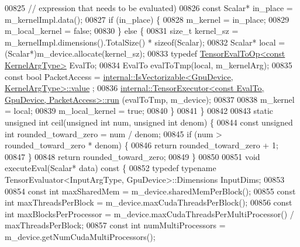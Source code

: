 \begin{DoxyCode}
00825     \textcolor{comment}{// expression that needs to be evaluated)}
00826     \textcolor{keyword}{const} Scalar* in\_place = m\_kernelImpl.data();
00827     \textcolor{keywordflow}{if} (in\_place) \{
00828       m\_kernel = in\_place;
00829       m\_local\_kernel = \textcolor{keyword}{false};
00830     \} \textcolor{keywordflow}{else} \{
00831       \textcolor{keywordtype}{size\_t} kernel\_sz = m\_kernelImpl.dimensions().TotalSize() * \textcolor{keyword}{sizeof}(Scalar);
00832       Scalar* local = (Scalar*)m\_device.allocate(kernel\_sz);
00833       \textcolor{keyword}{typedef} \hyperlink{class_eigen_1_1_tensor_eval_to_op}{TensorEvalToOp<const KernelArgType>} EvalTo;
00834       EvalTo evalToTmp(local, m\_kernelArg);
00835       \textcolor{keyword}{const} \textcolor{keywordtype}{bool} PacketAccess = 
      \hyperlink{struct_eigen_1_1internal_1_1_is_vectorizable}{internal::IsVectorizable<GpuDevice, KernelArgType>::value}
      ;
00836       \hyperlink{class_eigen_1_1internal_1_1_tensor_executor}{internal::TensorExecutor<const EvalTo, GpuDevice, PacketAccess>::run}
      (evalToTmp, m\_device);
00837 
00838       m\_kernel = local;
00839       m\_local\_kernel = \textcolor{keyword}{true};
00840     \}
00841   \}
00842 
00843   \textcolor{keyword}{static} \textcolor{keywordtype}{unsigned} \textcolor{keywordtype}{int} ceil(\textcolor{keywordtype}{unsigned} \textcolor{keywordtype}{int} num, \textcolor{keywordtype}{unsigned} \textcolor{keywordtype}{int} denom) \{
00844     \textcolor{keyword}{const} \textcolor{keywordtype}{unsigned} \textcolor{keywordtype}{int} rounded\_toward\_zero = num / denom;
00845     \textcolor{keywordflow}{if} (num > rounded\_toward\_zero * denom) \{
00846       \textcolor{keywordflow}{return} rounded\_toward\_zero + 1;
00847     \}
00848     \textcolor{keywordflow}{return} rounded\_toward\_zero;
00849   \}
00850 
00851   \textcolor{keywordtype}{void} executeEval(Scalar* data)\textcolor{keyword}{ const }\{
00852     \textcolor{keyword}{typedef} \textcolor{keyword}{typename} TensorEvaluator<InputArgType, GpuDevice>::Dimensions InputDims;
00853 
00854     \textcolor{keyword}{const} \textcolor{keywordtype}{int} maxSharedMem = m\_device.sharedMemPerBlock();
00855     \textcolor{keyword}{const} \textcolor{keywordtype}{int} maxThreadsPerBlock = m\_device.maxCudaThreadsPerBlock();
00856     \textcolor{keyword}{const} \textcolor{keywordtype}{int} maxBlocksPerProcessor = m\_device.maxCudaThreadsPerMultiProcessor() / maxThreadsPerBlock;
00857     \textcolor{keyword}{const} \textcolor{keywordtype}{int} numMultiProcessors = m\_device.getNumCudaMultiProcessors();

\end{DoxyCode}
